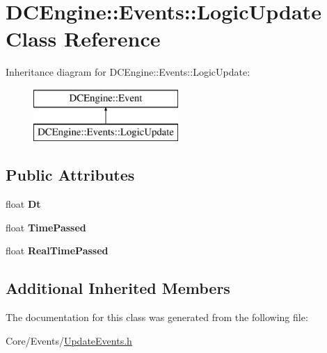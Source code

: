 \hypertarget{classDCEngine_1_1Events_1_1LogicUpdate}{\section{D\-C\-Engine\-:\-:Events\-:\-:Logic\-Update Class Reference}
\label{classDCEngine_1_1Events_1_1LogicUpdate}
}
Inheritance diagram for D\-C\-Engine\-:\-:Events\-:\-:Logic\-Update\-:\begin{figure}[H]
\begin{center}
\leavevmode
\includegraphics[height=2.000000cm]{classDCEngine_1_1Events_1_1LogicUpdate}
\end{center}
\end{figure}
\subsection*{Public Attributes}
\begin{DoxyCompactItemize}
\item 
\hypertarget{classDCEngine_1_1Events_1_1LogicUpdate_abc0625e91e27dc6bc732a52ffdcc4ec8}{float {\bfseries Dt}}\label{classDCEngine_1_1Events_1_1LogicUpdate_abc0625e91e27dc6bc732a52ffdcc4ec8}

\item 
\hypertarget{classDCEngine_1_1Events_1_1LogicUpdate_aeca7a1e60427ddb9348a742a39ed6312}{float {\bfseries Time\-Passed}}\label{classDCEngine_1_1Events_1_1LogicUpdate_aeca7a1e60427ddb9348a742a39ed6312}

\item 
\hypertarget{classDCEngine_1_1Events_1_1LogicUpdate_a306663568caea3ce8612b7586fc3f612}{float {\bfseries Real\-Time\-Passed}}\label{classDCEngine_1_1Events_1_1LogicUpdate_a306663568caea3ce8612b7586fc3f612}

\end{DoxyCompactItemize}
\subsection*{Additional Inherited Members}


The documentation for this class was generated from the following file\-:\begin{DoxyCompactItemize}
\item 
Core/\-Events/\hyperlink{UpdateEvents_8h}{Update\-Events.\-h}\end{DoxyCompactItemize}
